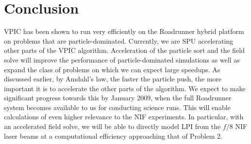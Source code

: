\documentclass[journal,twoside]{IEEEtran}
\begin{document}
%

\section{Conclusion}

VPIC has been shown to run very efficiently on the Roadrunner hybrid
platform on problems that are particle-dominated.  Currently, we are
SPU accelerating other parts of the VPIC algorithm.  Acceleration of
the particle sort and the field solve will improve the performance of
particle-dominated simulations as well as expand the class of problems
on which we can expect large speedups.  As discussed earlier, by
Amdahl's law, the faster the particle push, the more important it is
to accelerate the other parts of the algorithm.  We expect to make
significant progress towards this by January 2009, when the full
Roadrunner system becomes available to us for conducting science runs.
This will enable calculations of even higher relevance
to the NIF experiments. In particular, with an accelerated field
solve, we will be able to directly model LPI from the $f/8$ NIF laser
beams at a computational efficiency approaching that of Problem 2.
\end{document}
